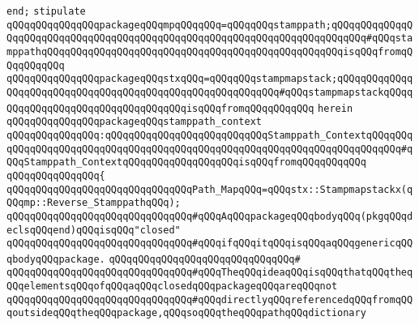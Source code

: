 \verb|end;|\newline
\newline
\verb|stipulate|\newline
\verb|qQQqqQQqqQQqqQQqpackageqQQqmpqQQqqQQq=qQQqqQQqstamppath;qQQqqQQqqQQqqQQqqQQqqQQqqQQqqQQqqQQqqQQqqQQqqQQqqQQqqQQqqQQqqQQqqQQqqQQqqQQq#qQQqstamppathqQQqqQQqqQQqqQQqqQQqqQQqqQQqqQQqqQQqqQQqqQQqqQQqqQQqisqQQqfromqQQqqQQqqQQq|\newline
\verb|qQQqqQQqqQQqqQQqpackageqQQqstxqQQq=qQQqqQQqstampmapstack;qQQqqQQqqQQqqQQqqQQqqQQqqQQqqQQqqQQqqQQqqQQqqQQqqQQqqQQqqQQq#qQQqstampmapstackqQQqqQQqqQQqqQQqqQQqqQQqqQQqqQQqqQQqisqQQqfromqQQqqQQqqQQq|\newline
\verb|herein|\newline
\newline
\verb|qQQqqQQqqQQqqQQqpackageqQQqstamppath_context|\newline
\verb|qQQqqQQqqQQqqQQq:qQQqqQQqqQQqqQQqqQQqqQQqqQQqStamppath_ContextqQQqqQQqqQQqqQQqqQQqqQQqqQQqqQQqqQQqqQQqqQQqqQQqqQQqqQQqqQQqqQQqqQQqqQQqqQQq#qQQqStamppath_ContextqQQqqQQqqQQqqQQqqQQqisqQQqfromqQQqqQQqqQQq|\newline
\verb|qQQqqQQqqQQqqQQq{|\newline
\verb|qQQqqQQqqQQqqQQqqQQqqQQqqQQqqQQqPath_MapqQQq=qQQqstx::Stampmapstackx(qQQqmp::Reverse_StamppathqQQq);|\newline
\newline
\verb|qQQqqQQqqQQqqQQqqQQqqQQqqQQqqQQq#qQQqAqQQqpackageqQQqbodyqQQq(pkgqQQqdeclsqQQqend)qQQqisqQQq"closed"|\newline
\verb|qQQqqQQqqQQqqQQqqQQqqQQqqQQqqQQq#qQQqifqQQqitqQQqisqQQqaqQQqgenericqQQqbodyqQQqpackage.|\newline
\verb|qQQqqQQqqQQqqQQqqQQqqQQqqQQqqQQq#|\newline
\verb|qQQqqQQqqQQqqQQqqQQqqQQqqQQqqQQq#qQQqTheqQQqideaqQQqisqQQqthatqQQqtheqQQqelementsqQQqofqQQqaqQQqclosedqQQqpackageqQQqareqQQqnot|\newline
\verb|qQQqqQQqqQQqqQQqqQQqqQQqqQQqqQQq#qQQqdirectlyqQQqreferencedqQQqfromqQQqoutsideqQQqtheqQQqpackage,qQQqsoqQQqtheqQQqpathqQQqdictionary|\newline
